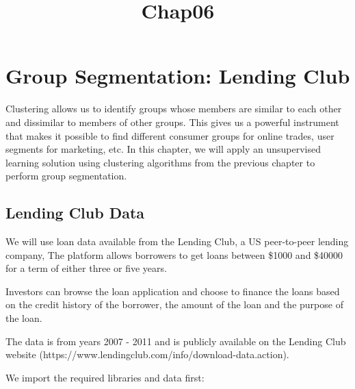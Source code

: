 \documentclass[11pt]{article}
\title{Chap06}
\begin{document}
    
    
    \maketitle
    
    

    
    \section{Group Segmentation: Lending
Club}\label{group-segmentation-lending-club}

Clustering allows us to identify groups whose members are similar to
each other and dissimilar to members of other groups. This gives us a
powerful instrument that makes it possible to find different consumer
groups for online trades, user segments for marketing, etc. In this
chapter, we will apply an unsupervised learning solution using
clustering algorithms from the previous chapter to perform group
segmentation.

\subsection{Lending Club Data}\label{lending-club-data}

We will use loan data available from the Lending Club, a US peer-to-peer
lending company, The platform allows borrowers to get loans between
\$1000 and \$40000 for a term of either three or five years.

Investors can browse the loan application and choose to finance the
loans based on the credit history of the borrower, the amount of the
loan and the purpose of the loan.

The data is from years 2007 - 2011 and is publicly available on the
Lending Club website
(https://www.lendingclub.com/info/download-data.action).

We import the required libraries and data first:
\end{document}
